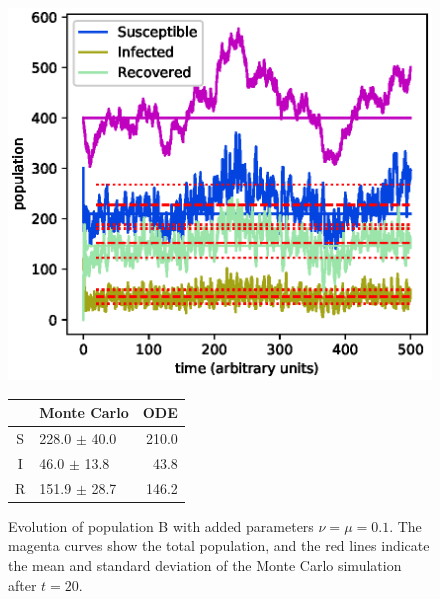 \documentclass[a4paper,10pt,twocolumn]{article}
\begin{document}
\begin{figure}[h]
	\centering
	\includegraphics[width=\linewidth]{Bd01e01_1.eps}
	\small
	\begin{tabular}{c l r}
  &    Monte Carlo     &  ODE  \\\hline
S &  228.0 $\pm$  40.0 &  210.0 \\
I &   46.0 $\pm$  13.8 &   43.8 \\
R &  151.9 $\pm$  28.7 &  146.2 \\\hline
	\end{tabular}
	\caption{Evolution of population B with added parameters $\nu=\mu=0.1$. The magenta curves show the total population, and the red lines indicate the mean and standard deviation of the Monte Carlo simulation after $t=20$.} 
	\label{fig:vit}
\end{figure}
\end{document}
